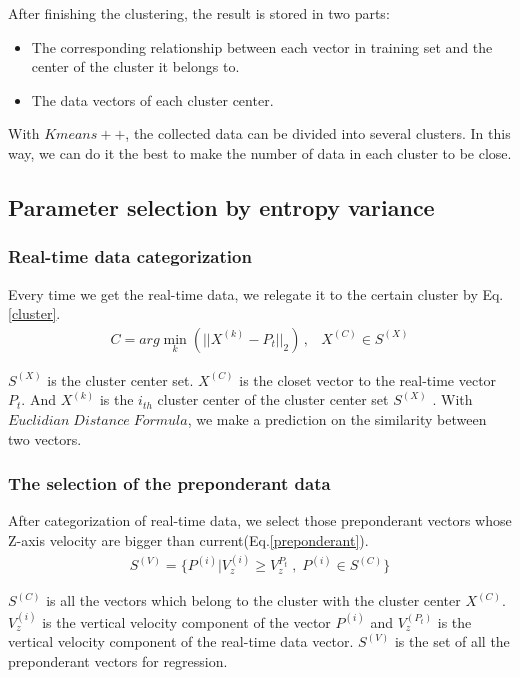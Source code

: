 After finishing the clustering, the result is stored in two parts:

\begin{itemize}
	\item The corresponding relationship between each vector in training set and the center of the cluster it belongs to.
	\item The data vectors of each cluster center.
\end{itemize}

With $Kmeans++$, the collected data can be divided into several clusters. In this way, we can do it the best to make the number of data in each cluster to be close.

\subsection{Parameter selection by entropy variance}

\subsubsection{Real-time data categorization}

Every time we get the real-time data, we relegate it to the certain cluster by Eq.\ref{cluster}.
\begin{eqnarray}\label{cluster}
C=arg\min \limits_{k}{(||X^{(k)}-P_{t}||_{2})} \, ,&X^{(C)}\in S^{(X)}
\end{eqnarray}

$S^{(X)}$ is the cluster center set. $X^{(C)}$ is the closet vector to the real-time vector $P_t$. And $X^{(k)}$ is the $i_{th}$ cluster center of the cluster center set $S^{(X)}$ . With $Euclidian \; Distance \; Formula$, we make a prediction on the similarity between two vectors.

\subsubsection{The selection of the preponderant data}

After categorization of real-time data, we select those preponderant vectors whose Z-axis velocity are bigger than current(Eq.\ref{preponderant}).
\begin{eqnarray}\label{preponderant}
S^{(V)}=\{P^{(i)}|V_{z}^{(i)}\geq V_{z}^{P_{t}} \; , \; P^{(i)}\in S^{(C)}\}
\end{eqnarray}

$S^{(C)}$ is all the vectors which belong to the cluster with the cluster center $X^{(C)}$. $V_{z}^{(i)}$ is the vertical velocity component of the vector $P^{(i)}$ and $V_{z}^{(P_{t})}$ is the vertical velocity component of the real-time data vector. $S^{(V)}$ is the set of all the preponderant vectors for regression.

